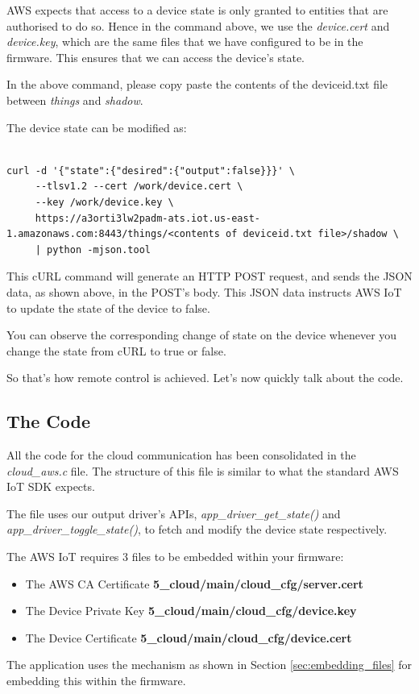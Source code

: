 \documentclass[main.tex]{subfiles}
\begin{document}
AWS expects that access to a device state is only granted to entities that are authorised to do so. Hence in the command above, we use the \textit{device.cert} and \textit{device.key}, which are the same files that we have configured to be in the firmware. This ensures that we can access the device's state.

In the above command, please copy paste the contents of the deviceid.txt file between \textit{things} and \textit{shadow}.

The device state can be modified as:
\begin{verbatim}

curl -d '{"state":{"desired":{"output":false}}}' \ 
     --tlsv1.2 --cert /work/device.cert \ 
     --key /work/device.key \ 
     https://a3orti3lw2padm-ats.iot.us-east-1.amazonaws.com:8443/things/<contents of deviceid.txt file>/shadow \
     | python -mjson.tool
\end{verbatim}

This cURL command will generate an HTTP POST request, and sends the JSON data, as shown above, in the POST's body. This JSON data instructs AWS IoT to update the state of the device to false.

You can observe the corresponding change of state on the device whenever you change the state from cURL to true or false.

So that's how remote control is achieved. Let's now quickly talk about the code.

\subsection{The Code}\index{The Code}
All the code for the cloud communication has been consolidated in the \textit{cloud\_aws.c} file. The structure of this file is similar to what the standard AWS IoT SDK expects.

The file uses our output driver's APIs, \textit{app\_driver\_get\_state()} and \textit{app\_driver\_toggle\_state()}, to fetch and modify the device state respectively.

The AWS IoT requires 3 files to be embedded within your firmware:
\begin{itemize}
        \item The AWS CA Certificate  \textbf{5\_cloud/main/cloud\_cfg/server.cert}
        \item The Device Private Key  \textbf{5\_cloud/main/cloud\_cfg/device.key}
        \item The Device Certificate  \textbf{5\_cloud/main/cloud\_cfg/device.cert}
\end{itemize}
The application uses the mechanism as shown in Section \ref{sec:embedding_files} for embedding this within the firmware.
\end{document}
